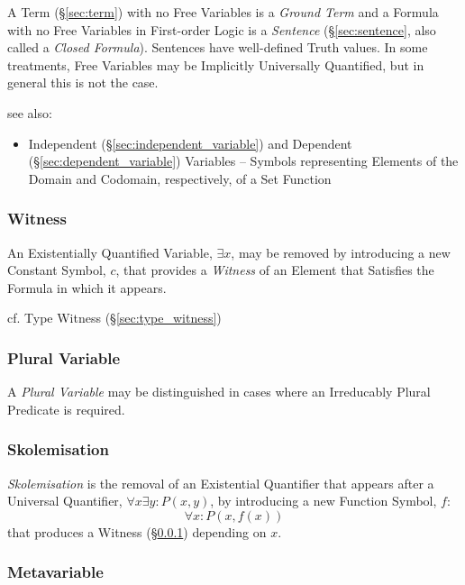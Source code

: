 A Term (\S\ref{sec:term}) with no Free Variables is a \emph{Ground
  Term} and a Formula with no Free Variables in First-order Logic is a
\emph{Sentence} (\S\ref{sec:sentence}, also called a \emph{Closed
  Formula}). Sentences have well-defined Truth values. In some
treatments, Free Variables may be Implicitly Universally Quantified,
but in general this is not the case.

see also:
\begin{itemize}
  \item Independent (\S\ref{sec:independent_variable}) and Dependent
    (\S\ref{sec:dependent_variable}) Variables -- Symbols representing
    Elements of the Domain and Codomain, respectively, of a Set Function
\end{itemize}



\subsubsection{Witness}\label{sec:witness}

An Existentially Quantified Variable, $\exists x$, may be removed by
introducing a new Constant Symbol, $c$, that provides a \emph{Witness}
of an Element that Satisfies the Formula in which it appears.

cf. Type Witness (\S\ref{sec:type_witness})



\subsubsection{Plural Variable}\label{sec:plural_variable}
\cite{laycock10}

A \emph{Plural Variable} may be distinguished in cases where an
Irreducably Plural Predicate is required.



\subsubsection{Skolemisation}\label{sec:skolemisation}

\emph{Skolemisation} is the removal of an Existential Quantifier that
appears after a Universal Quantifier, $\forall x \exists y : P (x,y)$,
by introducing a new Function Symbol, $f$:
\[
  \forall x : P (x, f(x))
\]
that produces a Witness (\S\ref{sec:witness}) depending on $x$.



\subsubsection{Metavariable}\label{sec:metavariable}

